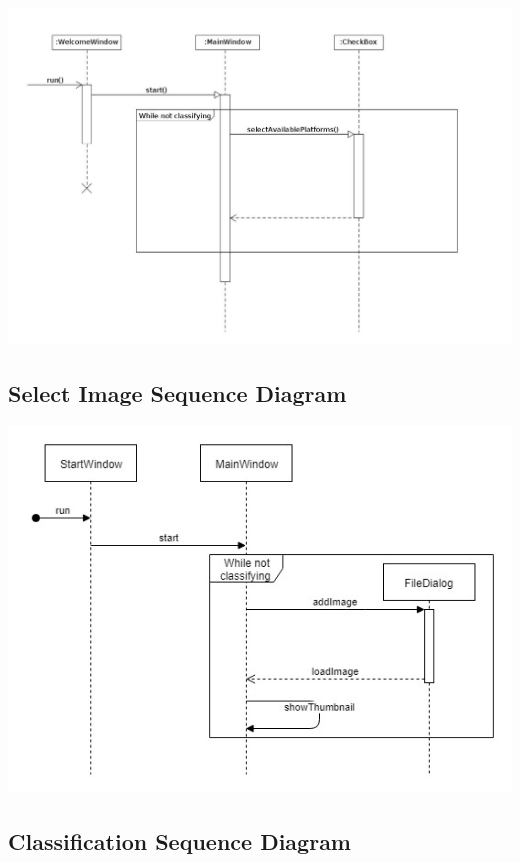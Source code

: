 \documentclass[parskip=full]{scrartcl}
\begin{document}
\begin{center}
\includegraphics[width=1.0\textwidth]{SelectPlatforms.jpg}
\end{center}

\subsection {Select Image Sequence Diagram}

\begin{center}
\includegraphics[width=1.0\textwidth]{SelectImageSeqDiag.jpg}
\end{center}

\pagebreak

\subsection {Classification Sequence Diagram}
\end{document}
